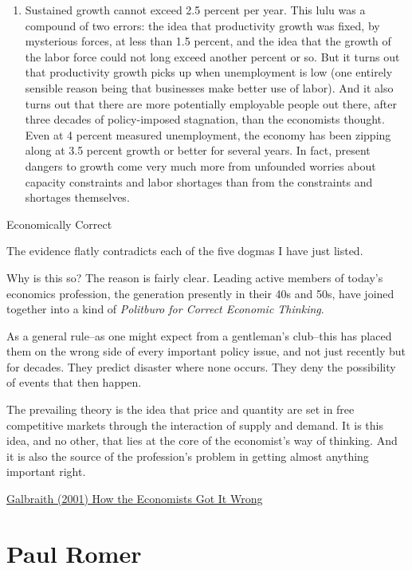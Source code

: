 \documentclass[
]{book}
\providecommand{\tightlist}{%
  \setlength{\itemsep}{0pt}\setlength{\parskip}{0pt}}
\begin{document}
\begin{enumerate}
\def\labelenumi{\arabic{enumi}.}
\setcounter{enumi}{4}
\tightlist
\item
  Sustained growth cannot exceed 2.5 percent per year. This lulu was a compound of two errors: the idea that productivity growth was fixed, by mysterious forces, at less than 1.5 percent, and the idea that the growth of the labor force could not long exceed another percent or so. But it turns out that productivity growth picks up when unemployment is low (one entirely sensible reason being that businesses make better use of labor). And it also turns out that there are more potentially employable people out there, after three decades of policy-imposed stagnation, than the economists thought. Even at 4 percent measured unemployment, the economy has been zipping along at 3.5 percent growth or better for several years. In fact, present dangers to growth come very much more from unfounded worries about capacity constraints and labor shortages than from the constraints and shortages themselves.
\end{enumerate}

Economically Correct

The evidence flatly contradicts each of the five dogmas I have just listed.

Why is this so? The reason is fairly clear. Leading active members of today's economics profession, the generation presently in their 40s and 50s, have joined together into a kind of \emph{Politburo for Correct Economic Thinking}.

As a general rule--as one might expect from a gentleman's club--this has placed them on the wrong side of every important policy issue, and not just recently but for decades. They predict disaster where none occurs. They deny the possibility of events that then happen.

The prevailing theory is the idea that price and quantity are set in free competitive markets through the interaction of supply and demand. It is this idea, and no other, that lies at the core of the economist's way of thinking. And it is also the source of the profession's problem in getting almost anything important right.

\href{https://prospect.org/features/econo\%20mists-got-wrong/}{Galbraith (2001) How the Economists Got It Wrong}

\hypertarget{paul-romer}{%
\section{Paul Romer}\label{paul-romer}}
\end{document}
